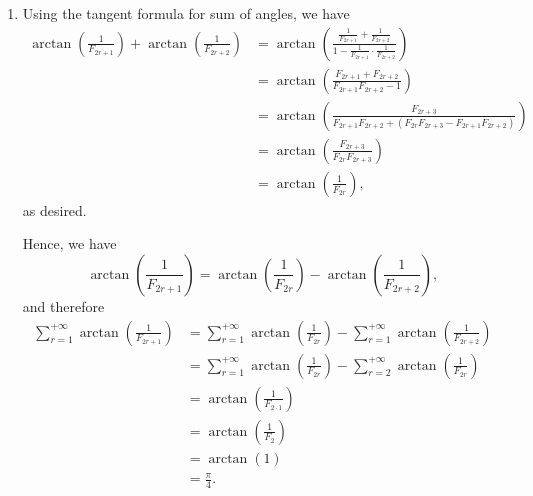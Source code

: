 \begin{enumerate}
    \item Using the tangent formula for sum of angles, we have
          \begin{align*}
              \arctan \left(\frac{1}{F_{2r + 1}}\right) + \arctan \left(\frac{1}{F_{2r + 2}}\right) & = \arctan \left(\frac{\frac{1}{F_{2r + 1}} + \frac{1}{F_{2r + 2}}}{1 - \frac{1}{F_{2r + 1}} \cdot \frac{1}{F_{2r + 2}}}\right) \\
                                                                                                    & = \arctan \left(\frac{F_{2r + 1} + F_{2r + 2}}{F_{2r + 1} F_{2r + 2} - 1}\right)                                               \\
                                                                                                    & = \arctan \left(\frac{F_{2r + 3}}{F_{2r + 1} F_{2r + 2} + (F_{2r} F_{2r + 3} - F_{2r + 1} F_{2r + 2})}\right)                  \\
                                                                                                    & = \arctan \left(\frac{F_{2r + 3}}{F_{2r} F_{2r + 3}}\right)                                                                    \\
                                                                                                    & = \arctan \left(\frac{1}{F_{2r}}\right),
          \end{align*}
          as desired.

          Hence, we have
          \[
              \arctan \left(\frac{1}{F_{2r + 1}}\right) = \arctan \left(\frac{1}{F_{2r}}\right) - \arctan \left(\frac{1}{F_{2r + 2}}\right),
          \]
          and therefore
          \begin{align*}
              \sum_{r = 1}^{+\infty} \arctan \left(\frac{1}{F_{2r + 1}}\right) & = \sum_{r = 1}^{+\infty} \arctan \left(\frac{1}{F_{2r}}\right) - \sum_{r = 1}^{+\infty} \arctan \left(\frac{1}{F_{2r + 2}}\right) \\
                                                                               & = \sum_{r = 1}^{+\infty} \arctan \left(\frac{1}{F_{2r}}\right) - \sum_{r = 2}^{+\infty} \arctan \left(\frac{1}{F_{2r}}\right)     \\
                                                                               & = \arctan \left(\frac{1}{F_{2 \cdot 1}}\right)                                                                                    \\
                                                                               & = \arctan \left(\frac{1}{F_2}\right)                                                                                              \\
                                                                               & = \arctan \left(1\right)                                                                                                          \\
                                                                               & = \frac{\pi}{4}.
          \end{align*}
\end{enumerate}